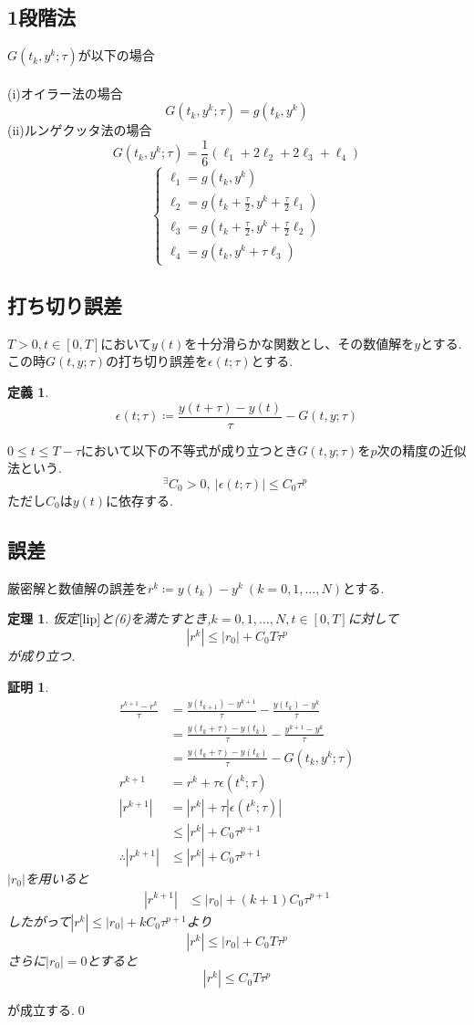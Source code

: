 \documentclass[a4,12pt]{article}
\newtheorem{thm}{定理}
\newtheorem{dfn}{定義}
\newtheorem{prf}{証明}
\begin{document}
\subsection{1段階法}
$G(t_k,y^k;\tau)$が以下の場合\\
\\(i)オイラー法の場合
\[G(t_k,y^k;\tau)=g(t_k,y^k)\]
(ii)ルンゲクッタ法の場合
\[G(t_k,y^k;\tau)=\frac{1}{6}(\ell_1+2\ell_2+2\ell_3+\ell_4)\]
\[\begin{cases}
\ell_1=g(t_k,y^k)\\
\ell_2=g(t_k+\displaystyle\frac{\tau}{2},y^k+\frac{\tau}{2}\ell_1)\\
\ell_3=g(t_k+\displaystyle\frac{\tau}{2},y^k+\frac{\tau}{2}\ell_2)\\ 
\ell_4=g(t_k,y^k+\tau \ell_3)
\end{cases}\]
\subsection{打ち切り誤差}
$T>0,t\in[0,T]$において$y(t)$を十分滑らかな関数とし、その数値解を$y$とする.この時$G(t,y;\tau)$の打ち切り誤差を$\epsilon(t;\tau)$とする.
\begin{dfn}\[\epsilon(t;\tau)\coloneqq\frac{y(t+\tau)-y(t)}{\tau}-G(t,y;\tau)\]\end{dfn}
$0\leq t\leq T-\tau$において以下の不等式が成り立つとき$G(t,y;\tau)$を$p$次の精度の近似法という.
\begin{equation}
{}^\exists C_0>0,\ |\epsilon(t;\tau)|\leq C_0\tau^p\;
\end{equation}
ただし$C_0$は$y(t)$に依存する.
\subsection{誤差}
厳密解と数値解の誤差を$r^k\coloneqq y(t_k)-y^k\ (k=0,1,\ldots,N)$とする.
\begin{thm}仮定$\ref{lip}$と(6)を満たすとき,$k=0,1,\ldots ,N,t\in[0,T]$に対して
\[|r^{k}|\leq |r_0|+C_0T\tau^{p}\]
が成り立つ.
\end{thm}
\begin{prf}
\[\begin{split}
\frac{r^{k+1}-r^k}{\tau}&=\frac{y(t_{k+1})-y^{k+1}}{\tau}- \frac{y(t_k)-y^k}{\tau}\\
&=\frac{y(t_k+\tau)-y(t_k)}{\tau}- \frac{y^{k+1}-y^k}{\tau}\\
&=\frac{y(t_k+\tau)-y(t_k)}{\tau}-G(t_k,y^k;\tau)\\
r^{k+1}&=r^k+\tau\epsilon(t^k;\tau)\\
|r^{k+1}|&=|r^k|+\tau |\epsilon(t^k;\tau)|\\
&\leq |r^k|+C_0\tau^{p+1}\\
\therefore |r^{k+1}|&\leq |r^k|+C_0\tau^{p+1}
\end{split}\]
$|r_0|$を用いると
\[\begin{split}
|r^{k+1}|&\leq |r_0|+(k+1)C_0\tau^{p+1}
\end{split}\]
したがって$|r^{k}|\leq |r_0|+kC_0\tau^{p+1}$より
\[|r^{k}|\leq |r_0|+C_0T\tau^{p}\]
さらに$|r_0|=0$とすると
\[|r^{k}|\leq C_0T\tau^{p}\]
\end{prf}
が成立する.\qed
\end{document}
